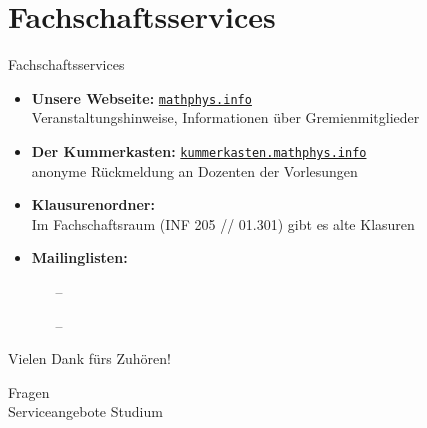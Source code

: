 
\section{Fachschaftsservices}
\begin{frame}{Fachschaftsservices}
    \begin{itemize}[<+->]
        \item \textbf{Unsere Webseite:} \href{mathphys.info}{\texttt{mathphys.info}} \\
            Veranstaltungshinweise, Informationen über Gremienmitglieder
        \item \textbf{Der Kummerkasten:} \href{https://kummerkasten.mathphys.info}{\texttt{kummerkasten.mathphys.info}} \\
            anonyme Rückmeldung an Dozenten der Vorlesungen
        \item \textbf{Klausurenordner:} \\
            Im Fachschaftsraum (INF 205 // 01.301) gibt es alte Klasuren
        \item \textbf{Mailinglisten:}
            \begin{itemize}
                \item[--]  \\
                \item[--]  \\
            \end{itemize}
    \end{itemize}
\end{frame}

\begin{frame}{Vielen Dank fürs Zuhören!}
    \vfill
    \begin{center}
        \Huge Fragen \\[3.5pt]
        \normalsize Serviceangebote Studium
    \end{center}
\end{frame}


